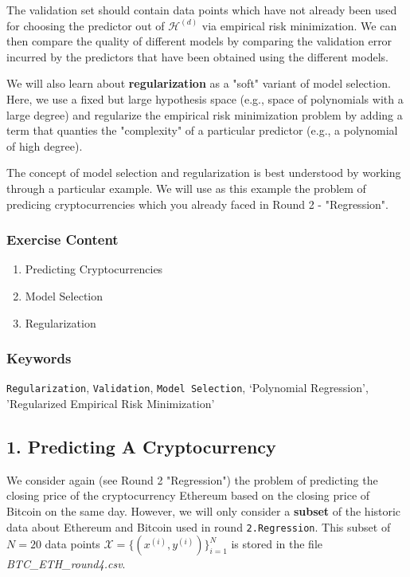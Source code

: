 \documentclass[11pt]{article}
\providecommand{\tightlist}{%
      \setlength{\itemsep}{0pt}\setlength{\parskip}{0pt}}
\begin{document}
The validation set should contain data points which have not already
been used for choosing the predictor out of \(\mathcal{H}^{(d)}\) via
empirical risk minimization. We can then compare the quality of
different models by comparing the validation error incurred by the
predictors that have been obtained using the different models.

We will also learn about \textbf{regularization} as a "soft" variant of
model selection. Here, we use a fixed but large hypothesis space (e.g.,
space of polynomials with a large degree) and regularize the empirical
risk minimization problem by adding a term that quanties the
"complexity" of a particular predictor (e.g., a polynomial of high
degree).

The concept of model selection and regularization is best understood by
working through a particular example. We will use as this example the
problem of predicing cryptocurrencies which you already faced in Round 2
- "Regression".

\subsubsection{Exercise Content}\label{exercise-content}

\begin{enumerate}
\def\labelenumi{\arabic{enumi}.}
\tightlist
\item
  Predicting Cryptocurrencies
\item
  Model Selection
\item
  Regularization
\end{enumerate}

\subsubsection{Keywords}\label{keywords}

\texttt{Regularization}, \texttt{Validation}, \texttt{Model\ Selection},
`Polynomial Regression', 'Regularized Empirical Risk Minimization'

    \subsection{1. Predicting A
Cryptocurrency}\label{predicting-a-cryptocurrency}

We consider again (see Round 2 "Regression") the problem of predicting
the closing price of the cryptocurrency Ethereum based on the closing
price of Bitcoin on the same day. However, we will only consider a
\textbf{subset} of the historic data about Ethereum and Bitcoin used in
round \texttt{2.Regression}. This subset of \(N=20\) data points
\(\mathcal{X} = \{ (x^{(i)},y^{(i)}) \}_{i=1}^{N}\) is stored in the
file \emph{BTC\_ETH\_round4.csv}.
\end{document}
